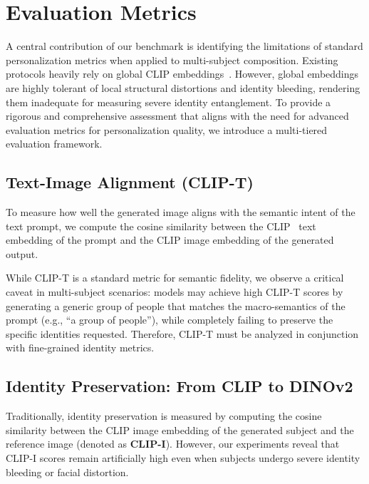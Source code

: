 \section{Evaluation Metrics}

A central contribution of our benchmark is identifying the limitations of standard personalization metrics when applied to multi-subject composition. Existing protocols heavily rely on global CLIP embeddings~\cite{radford2021learning}. However, global embeddings are highly tolerant of local structural distortions and identity bleeding, rendering them inadequate for measuring severe identity entanglement. To provide a rigorous and comprehensive assessment that aligns with the need for advanced evaluation metrics for personalization quality, we introduce a multi-tiered evaluation framework.

\subsection{Text-Image Alignment (CLIP-T)}
To measure how well the generated image aligns with the semantic intent of the text prompt, we compute the cosine similarity between the CLIP~\cite{radford2021learning} text embedding of the prompt and the CLIP image embedding of the generated output. 

While CLIP-T is a standard metric for semantic fidelity, we observe a critical caveat in multi-subject scenarios: models may achieve high CLIP-T scores by generating a generic group of people that matches the macro-semantics of the prompt (e.g., ``a group of people''), while completely failing to preserve the specific identities requested. Therefore, CLIP-T must be analyzed in conjunction with fine-grained identity metrics.

\subsection{Identity Preservation: From CLIP to DINOv2}
Traditionally, identity preservation is measured by computing the cosine similarity between the CLIP image embedding of the generated subject and the reference image (denoted as \textbf{CLIP-I}). However, our experiments reveal that CLIP-I scores remain artificially high even when subjects undergo severe identity bleeding or facial distortion.

